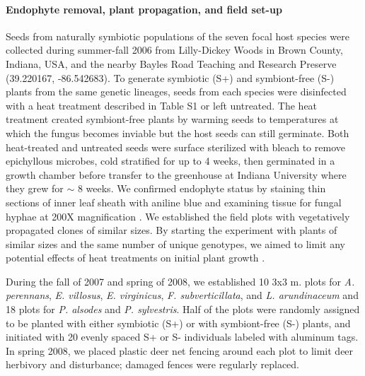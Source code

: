 \documentclass[12pt]{article}
\begin{document}
\paragraph*{Endophyte removal, plant propagation, and field set-up}
Seeds from naturally symbiotic populations of the seven focal host species were collected during summer-fall 2006 from Lilly-Dickey Woods in Brown County, Indiana, USA, and the nearby Bayles Road Teaching and Research Preserve (39.220167, -86.542683). 
To generate symbiotic (S+) and symbiont-free (S-) plants from the same genetic lineages, seeds from each species were disinfected with a heat treatment described in Table S1 or left untreated. 
The heat treatment created symbiont-free plants by warming seeds to temperatures at which the fungus becomes inviable but the host seeds can still germinate.
Both heat-treated and untreated seeds were surface sterilized with bleach to remove epichyllous microbes, cold stratified for up to 4 weeks, then germinated in a growth chamber before transfer to the greenhouse at Indiana University where they grew for $\sim$ 8 weeks. 
We confirmed endophyte status by staining thin sections of inner leaf sheath with aniline blue and examining tissue for fungal hyphae at 200X magnification \cite{bacon2018stains}. 
We established the field plots with vegetatively propagated clones of similar sizes. 
By starting the experiment with plants of similar sizes and the same number of unique genotypes, we aimed to limit any potential effects of heat treatments on initial plant growth \cite{rudgers2009benefits}.

During the fall of 2007 and spring of 2008, we established 10 3x3 m. plots for \emph{A. perennans}, \emph{E. villosus}, \emph{E. virginicus}, \emph{F. subverticillata}, and \emph{L. arundinaceum}  and 18 plots for \emph{P. alsodes} and \emph{P. sylvestris}.
Half of the plots were randomly assigned to be planted with either symbiotic (S+) or with symbiont-free (S-) plants, and initiated with 20 evenly spaced S+ or S- individuals labeled with aluminum tags.
In spring 2008, we placed plastic deer net fencing around each plot to limit deer herbivory and disturbance; damaged fences were regularly replaced.
\end{document}
